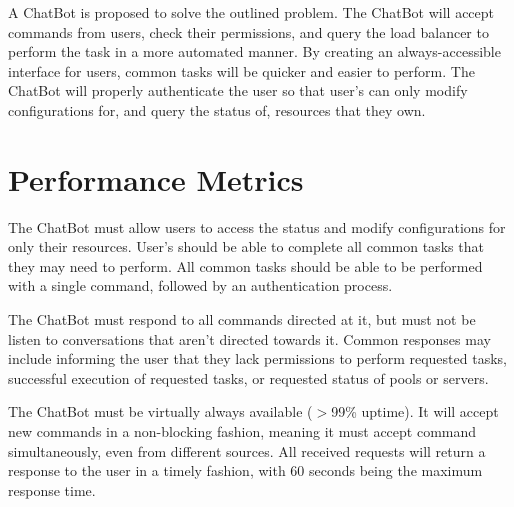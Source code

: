 \documentclass[onecolumn, draftclsnofoot,10pt, compsoc]{IEEEtran}
\begin{document}
A ChatBot is proposed to solve the outlined problem.
The ChatBot will accept commands from users, check their permissions, and query the load balancer to perform the task in a more automated manner.
By creating an always-accessible interface for users, common tasks will be quicker and easier to perform. The ChatBot will properly authenticate the user so that user's can only modify configurations for, and query the status of, resources that they own. 




\section{Performance Metrics}
The ChatBot must allow users to access the status and modify configurations for only their resources.
User's should be able to complete all common tasks that they may need to perform.
All common tasks should be able to be performed with a single command, followed by an authentication process.

The ChatBot must respond to all commands directed at it, but must not be listen to conversations that aren't directed towards it.
Common responses may include informing the user that they lack permissions to perform requested tasks, successful execution of requested tasks, or requested status of pools or servers.

The ChatBot must be virtually always available ($>$99\% uptime).
It will accept new commands in a non-blocking fashion, meaning it must accept command simultaneously, even from different sources.
All received requests will return a response to the user in a timely fashion, with 60 seconds being the maximum response time.
\end{document}
